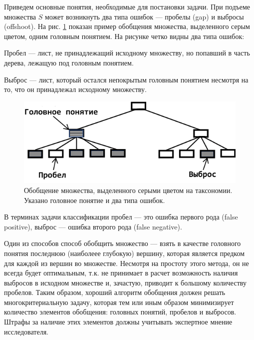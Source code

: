 \documentclass[12pt]{article}
\newenvironment{itemize*}%
{\begin{itemize}%
		\setlength{\itemsep}{0pt}%
		\setlength{\parskip}{0pt}}%
	{\end{itemize}}
\begin{document}
Приведем основные понятия, необходимые для постановки задачи. При подъеме множества $S$ может возникнуть два типа ошибок --- пробелы (gap) и выбросы (offshoot). На рис. \ref{fig:gap_offshoot_example} показан пример обобщения множества, выделенного серым цветом, одним головным понятием. На рисунке четко видны два типа ошибок:
\begin{itemize*}
	\item Пробел ---  лист, не принадлежащий исходному множеству, но попавший в часть дерева, лежащую под головным понятием.
	\item Выброс --- лист, который остался непокрытым головным понятием несмотря на то, что он принадлежал исходному множеству. 
\end{itemize*} 

\begin{figure}
\centering
\includegraphics[width=0.5\linewidth]{images/gap_offshoot_example}
\caption{Обобщение множества, выделенного серыми цветом на таксономии. Указано головное понятие и два типа ошибок.}
\label{fig:gap_offshoot_example}
\end{figure}

В терминах задачи классификации пробел --- это  ошибка первого рода (false positive), выброс --- ошибка второго рода (false negative). 

Один из способов способ обобщить множество --- взять в качестве головного понятия последнюю (наиболеее глубокую) вершину, которая является предком для каждой из вершин во множестве. Несмотря на простоту этого метода, он не всегда будет оптимальным, т.к. не принимает в расчет возможность наличия выбросов в исходном множестве и, зачастую, приводит к большому количеству пробелов. Таким образом, хороший алгоритм обобщения должен решать многокритериальную задачу, которая тем или иным образом минимизирует количество элементов обобщения: головных понятий, пробелов и выбросов. Штрафы за наличие этих элементов должны учитывать экспертное мнение исследователя. 
\end{document}
